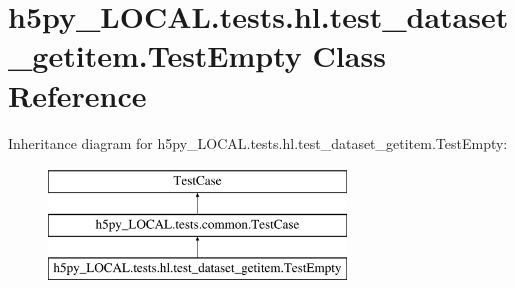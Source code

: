 \hypertarget{classh5py__LOCAL_1_1tests_1_1hl_1_1test__dataset__getitem_1_1TestEmpty}{}\section{h5py\+\_\+\+L\+O\+C\+A\+L.\+tests.\+hl.\+test\+\_\+dataset\+\_\+getitem.\+Test\+Empty Class Reference}
\label{classh5py__LOCAL_1_1tests_1_1hl_1_1test__dataset__getitem_1_1TestEmpty}
Inheritance diagram for h5py\+\_\+\+L\+O\+C\+A\+L.\+tests.\+hl.\+test\+\_\+dataset\+\_\+getitem.\+Test\+Empty\+:\begin{figure}[H]
\begin{center}
\leavevmode
\includegraphics[height=3.000000cm]{classh5py__LOCAL_1_1tests_1_1hl_1_1test__dataset__getitem_1_1TestEmpty}
\end{center}
\end{figure}

